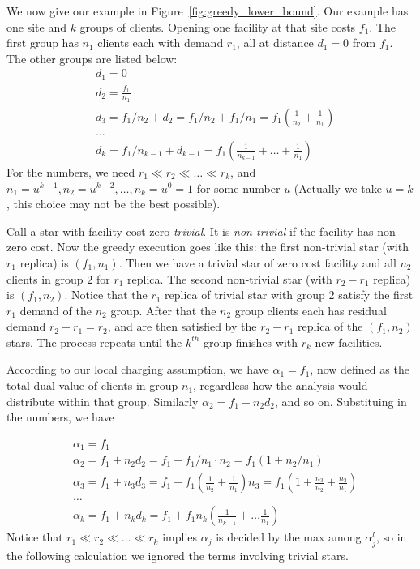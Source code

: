 \documentclass[oneside,final]{ucr}
\begin{document}
We now give our example in
Figure~\ref{fig:greedy_lower_bound}. Our example has one
site and $k$ groups of clients. Opening one facility at that
site costs $f_1$. The first group has $n_1$ clients each
with demand $r_1$, all at distance $d_1 = 0$ from $f_1$. The
other groups are listed below:
\begin{align*}
  &d_1 = 0\\
  &d_2 = \frac{f_1}{n_1}\\
  &d_3 = f_1/n_2 + d_2 = f_1/n_2 + f_1/n_1 = f_1 (\frac{1}{n_2} + \frac{1}{n_1})\\
  &\ldots\\
  &d_k = f_1/n_{k-1} + d_{k-1} = f_1 (\frac{1}{n_{k-1}} + \ldots + \frac{1}{n_1})
\end{align*}
For the numbers, we need $r_1 \ll r_2 \ll \ldots \ll r_k$,
and $n_1 = u^{k-1}, n_2 = u^{k-2}, \ldots, n_k = u^0 = 1$
for some number $u$ (Actually we take $u=k$, this choice may
not be the best possible).

Call a star with facility cost zero \emph{trivial}. It is
\emph{non-trivial} if the facility has non-zero cost. Now
the greedy execution goes like this: the first non-trivial
star (with $r_1$ replica) is $(f_1, n_1)$. Then we have a
trivial star of zero cost facility and all $n_2$ clients in
group $2$ for $r_1$ replica. The second non-trivial star
(with $r_2 - r_1$ replica) is $(f_1, n_2)$. Notice that the
$r_1$ replica of trivial star with group $2$ satisfy the
first $r_1$ demand of the $n_2$ group. After that the $n_2$
group clients each has residual demand $r_2 - r_1 = r_2$,
and are then satisfied by the $r_2 - r_1$ replica of the
$(f_1, n_2)$ stars. The process repeats until the $k^{th}$
group finishes with $r_k$ new facilities.

According to our local charging assumption, we have
$\alpha_1 = f_1$, now defined as the total dual value of
clients in group $n_1$, regardless how the analysis would
distribute within that group. Similarly $\alpha_2 = f_1 +
n_2 d_2$, and so on. Substituing in the numbers, we have

\begin{align*}
  &\alpha_1 = f_1\\
  &\alpha_2 = f_1 + n_2 d_2 = f_1 + f_1/n_1\cdot n_2 = f_1 (1 + n_2 /
  n_1)\\
  &\alpha_3 = f_1 + n_3 d_3 = f_1 + f_1 (\frac{1}{n_2} +
  \frac{1}{n_1}) n_3 = f_1 (1 + \frac{n_3}{n_2} + \frac{n_3}{n_1})\\
  &\ldots\\
  &\alpha_k = f_1 + n_k d_k = f_1 + f_1 n_k (\frac{1}{n_{k-1}} + \ldots
  \frac{1}{n_1})
\end{align*}
Notice that $r_1 \ll r_2 \ll \ldots \ll r_k$ implies
$\alpha_j$ is decided by the max among $\alpha_j^l$, so in
the following calculation we ignored the terms involving
trivial stars.
\end{document}
